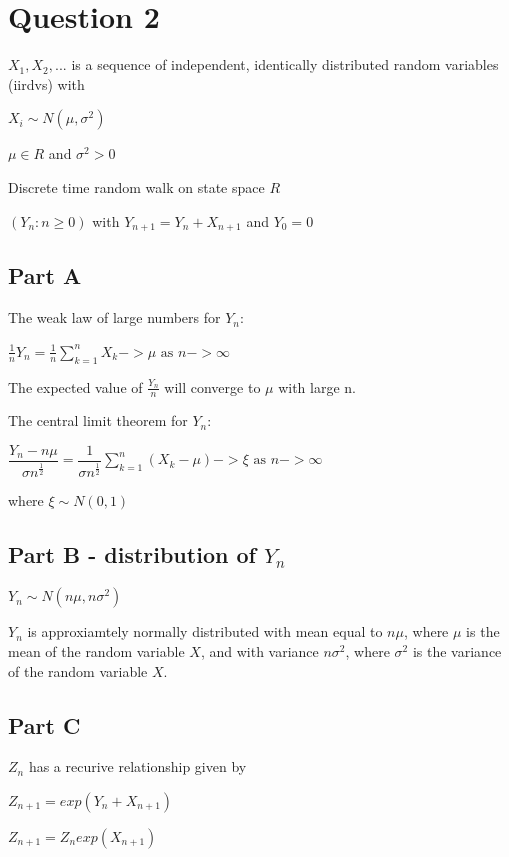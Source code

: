 \documentclass{article}
\begin{document}
\section{Question 2}

$X_1, X_2, ... $ is a sequence of independent, identically distributed random variables (iirdvs) with 

$X_i \sim N(\mu, \sigma^2)$ 

$\mu \in {R}$ and $\sigma^2 > 0$

Discrete time random walk on state space ${R}$

$(Y_n : n \geq 0)$ with $Y_{n+1} = Y_n + X_{n+1}$ and $Y_0 = 0$


\subsection{Part A}

The weak law of large numbers for $Y_n$:

$\frac{1}{n}Y_n = \frac{1}{n}\sum\limits_{k=1}^n X_k -> \mu \text{ as } n -> \infty$

The expected value of $\frac{Y_n}{n}$ will converge to $\mu$ with large n.

\bigskip
The central limit theorem for $Y_n$:

$\dfrac{Y_n - n\mu}{\sigma n^\frac{1}{2}} = \dfrac{1}{\sigma n^\frac{1}{2}}\sum\limits_{k=1}^n (X_k - \mu) -> \xi \text{ as } n -> \infty$

where $\xi \sim N(0,1)$

\subsection{Part B - distribution of $Y_n$}

$Y_n \sim N(n\mu, n\sigma^2)$

$Y_n$ is approxiamtely normally distributed with mean equal to $n\mu$, where $\mu$ is the mean of the random variable $X$, and with variance $n\sigma^2$, where $\sigma^2$ is the variance of the random variable $X$. 

\subsection{Part C}

$Z_n$ has a recurive relationship given by

$Z_{n+1} = exp(Y_n + X_{n+1})$

$Z_{n+1} = Z_n exp(X_{n+1})$
\end{document}
